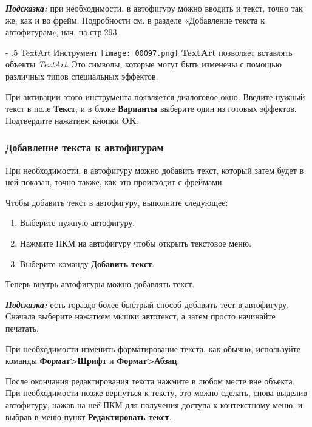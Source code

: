 ﻿\documentclass[a4paper,10pt]{article}
\makeatletter
\renewcommand\paragraph{%
   \@startsection{paragraph}{4}{0mm}%
      {-\baselineskip}%
      {.5\baselineskip}%
      {\normalfont\normalsize\bfseries}}
\makeatother
\begin{document}
\textbf{\textit{Подсказка:}} при необходимости, в автофигуру можно вводить и текст, точно так же, как и во фрейм. Подробности см. в разделе «Добавление текста к автофигурам», нач. на стр.293.

\paragraph{TextArt}
Инструмент \texttt{[image: 00097.png]} \textbf{TextArt} позволяет вставлять объекты \textit{TextArt}. Это символы, которые могут быть изменены с помощью различных типов специальных эффектов.

При активации этого инструмента появляется диалоговое окно. Введите нужный текст в поле \textbf{Текст}, и в блоке \textbf{Варианты} выберите один  из готовых эффектов. Подтвердите нажатием кнопки \textbf{OK}.

\subsubsection{Добавление текста к автофигурам}
При необходимости, в автофигуру можно добавить текст, который затем будет в ней показан, точно также, как это происходит с фреймами.

Чтобы добавить текст в автофигуру, выполните следующее:

\begin{enumerate}
 \item Выберите нужную автофигуру.
 \item Нажмите ПКМ  на автофигуру чтобы открыть текстовое меню.
 \item Выберите команду \textbf{Добавить текст}.
\end{enumerate}

Теперь внутрь автофигуры можно добавлять текст.

\begin{mdframed}[backgroundcolor=blue!10]
\textbf{\textit{Подсказка:}} есть гораздо более быстрый способ добавить тест в автофигуру. Сначала выберите нажатием мышки автотекст, а затем просто начинайте печатать.
\end{mdframed}

При необходимости изменить форматирование текста, как обычно, используйте команды \textbf{Формат>Шрифт} и \textbf{Формат>Абзац}.

После окончания редактирования текста нажмите в любом месте вне объекта. При необходимости позже вернуться к тексту, это можно сделать, снова выделив автофигуру, нажав на неё ПКМ для получения доступа к контекстному меню, и выбрав в меню пункт \textbf{Редактировать текст}.
\end{document}
